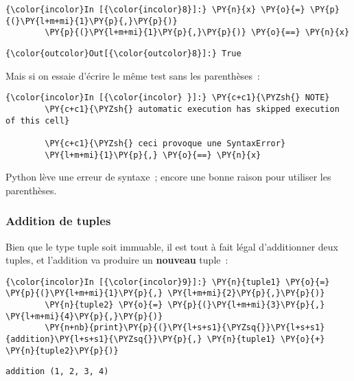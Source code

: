     \begin{Verbatim}[commandchars=\\\{\}]
{\color{incolor}In [{\color{incolor}8}]:} \PY{n}{x} \PY{o}{=} \PY{p}{(}\PY{l+m+mi}{1}\PY{p}{,}\PY{p}{)}
        \PY{p}{(}\PY{l+m+mi}{1}\PY{p}{,}\PY{p}{)} \PY{o}{==} \PY{n}{x}
\end{Verbatim}


\begin{Verbatim}[commandchars=\\\{\}]
{\color{outcolor}Out[{\color{outcolor}8}]:} True
\end{Verbatim}
            
    Mais si on essaie d'écrire le même test sans les parenthèses~:

    \begin{Verbatim}[commandchars=\\\{\}]
{\color{incolor}In [{\color{incolor} }]:} \PY{c+c1}{\PYZsh{} NOTE}
        \PY{c+c1}{\PYZsh{} automatic execution has skipped execution of this cell}
        
        \PY{c+c1}{\PYZsh{} ceci provoque une SyntaxError}
        \PY{l+m+mi}{1}\PY{p}{,} \PY{o}{==} \PY{n}{x}
\end{Verbatim}


    Python lève une erreur de syntaxe~; encore une bonne raison pour
utiliser les parenthèses.

    \hypertarget{addition-de-tuples}{%
\subsubsection{Addition de tuples}\label{addition-de-tuples}}

    Bien que le type tuple soit immuable, il est tout à fait légal
d'additionner deux tuples, et l'addition va produire un \textbf{nouveau}
tuple~:

    \begin{Verbatim}[commandchars=\\\{\}]
{\color{incolor}In [{\color{incolor}9}]:} \PY{n}{tuple1} \PY{o}{=} \PY{p}{(}\PY{l+m+mi}{1}\PY{p}{,} \PY{l+m+mi}{2}\PY{p}{,}\PY{p}{)}
        \PY{n}{tuple2} \PY{o}{=} \PY{p}{(}\PY{l+m+mi}{3}\PY{p}{,} \PY{l+m+mi}{4}\PY{p}{,}\PY{p}{)}
        \PY{n+nb}{print}\PY{p}{(}\PY{l+s+s1}{\PYZsq{}}\PY{l+s+s1}{addition}\PY{l+s+s1}{\PYZsq{}}\PY{p}{,} \PY{n}{tuple1} \PY{o}{+} \PY{n}{tuple2}\PY{p}{)}
\end{Verbatim}


    \begin{Verbatim}[commandchars=\\\{\}]
addition (1, 2, 3, 4)

    \end{Verbatim}

